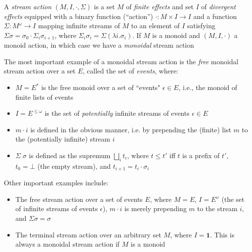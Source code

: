 \documentclass[acmsmall,screen,review]{acmart}
\newcommand{\mb}[1]{\ensuremath{\mathbf{#1}}}
\begin{document}
\begin{definition}
  A \textit{stream action} $(M, I, \cdot, \Sigma)$ is a set $M$ of \emph{finite
  effects} and set $I$ of \emph{divergent effects} equipped with a binary
  function (``action'') $\cdot : M \times I \to I$ and a function $\Sigma : M^\omega \to I$
  mapping infinite streams of $M$ to an element of $I$ satisfying $\Sigma \sigma
  = \sigma_0 \cdot \Sigma_i \sigma_{i + 1}$, where $\Sigma_i \sigma_i = \Sigma
  (\lambda i. \sigma_i)$. If $M$ is a monoid and $(M, I, \cdot)$ a monoid
  action, in which case we have a \emph{monoidal} stream action
\end{definition}
The most important example of a monoidal stream action is the \emph{free}
monoidal stream action over a set $E$, called the set of \emph{events}, where:
\begin{itemize}
  \item $M = E^*$ is the free monoid over a set of ``events" $\epsilon \in E$, i.e., the
  monoid of finite lists of events
  \item $I = E^{\leq \omega}$ is the set of \textit{potentially} infinite
  streams of events $\epsilon \in E$
  \item $m \cdot i$ is defined in the obvious manner, i.e. by prepending the (finite) list $m$ to
  the (potentially infinite) stream $i$
  \item $\Sigma\;\sigma$ is defined as the supremum $\bigsqcup_it_i$, where $t
  \leq t'$ iff $t$ is a prefix of $t'$, $t_0 = \bot$ (the empty stream), and
  $t_{i + 1} = t_i \cdot \sigma_i$
\end{itemize}
Other important examples include:
\begin{itemize}
  \item The free stream action over a set of events $E$, where $M = E$, $I =
  E^\omega$ (the set of infinite streams of events $\epsilon$), $m \cdot i$ is
  merely prepending $m$ to the stream $i$, and $\Sigma \sigma = \sigma$
  \item The terminal stream action over an arbitrary set $M$, where $I
  = \mb{1}$. This is always a monoidal stream action if $M$ is a monoid
\end{itemize}
\end{document}
